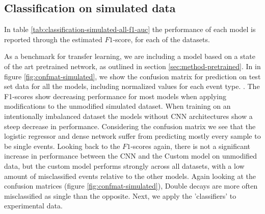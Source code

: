 \subsection{Classification on simulated data}
In table \ref{tab:classification-simulated-all-f1-auc} the performance of each model
is reported through the estimated $F1$-score, for each of the datasets. 

As a benchmark for transfer learning, we are including a model based on a state of the art pretrained 
network\cite{Simonyan2015}, as outlined in section \ref{sec:method-pretrained}. 
In in figure \ref{fig:confmat-simulated}, we show the confusion matrix for prediction
on test set data for all the models, including normalized values for each event type.
. The F1-scores show decreasing
performance for most models when applying modifications to the unmodified simulated dataset.
When training on an intentionally imbalanced dataset the models without CNN architectures 
show a steep decrease in performance.
Considering the confusion matrix we see that the logistic regressor and dense network
suffer from predicting mostly every sample to be single events. Looking back to the
$F1$-scores again, there is not a significant increase in performance between the
CNN and the Custom model on unmodified data, but the custom model performs strongly
across all datasets, with a low amount of misclassified events relative to the other
models. Again looking at the confusion matrices (figure \ref{fig:confmat-simulated}),
Double decays are more often misclassified as single than the opposite.
Next, we apply the 'classifiers' to experimental data.

